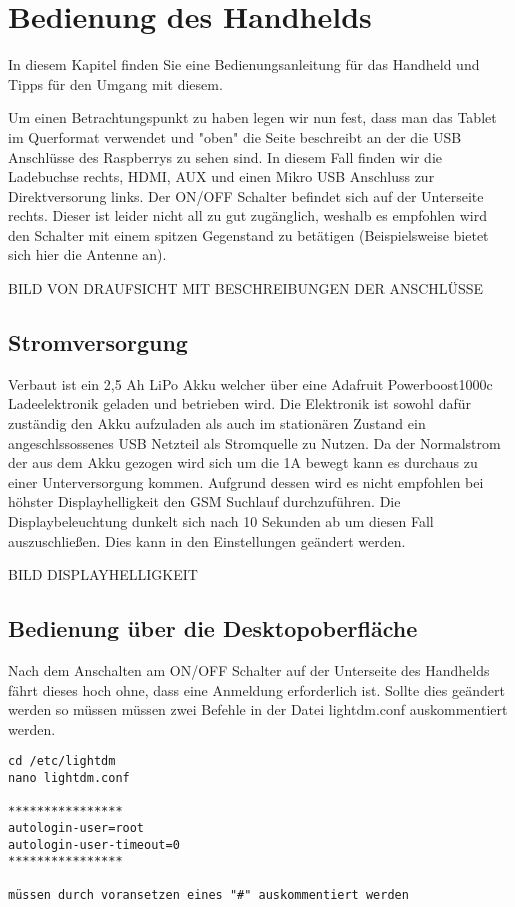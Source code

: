%
%
\chapter{Bedienung des Handhelds}
In diesem Kapitel finden Sie eine Bedienungsanleitung für das Handheld und Tipps für den Umgang mit diesem.

Um einen Betrachtungspunkt zu haben legen wir nun fest, dass man das Tablet im Querformat verwendet und "oben" die Seite beschreibt an der die USB Anschlüsse des Raspberrys zu sehen sind. In diesem Fall finden wir die Ladebuchse rechts, HDMI, AUX und einen Mikro USB Anschluss zur Direktversorung links. Der ON/OFF Schalter befindet sich auf der Unterseite rechts. Dieser ist leider nicht all zu gut zugänglich, weshalb es empfohlen wird den Schalter mit einem spitzen Gegenstand zu betätigen (Beispielsweise bietet sich hier die Antenne an).

BILD VON DRAUFSICHT MIT BESCHREIBUNGEN DER ANSCHLÜSSE 

\section{Stromversorgung}

Verbaut ist ein 2,5 Ah LiPo Akku welcher über eine Adafruit Powerboost1000c Ladeelektronik geladen und betrieben wird. Die Elektronik ist sowohl dafür zuständig den Akku aufzuladen als auch im stationären Zustand ein angeschlssossenes USB Netzteil als Stromquelle zu Nutzen. Da der Normalstrom der aus dem Akku gezogen wird sich um die 1A bewegt kann es durchaus zu einer Unterversorgung kommen. Aufgrund dessen wird es nicht empfohlen bei höhster Displayhelligkeit den GSM Suchlauf durchzuführen. Die Displaybeleuchtung dunkelt sich nach 10 Sekunden ab um diesen Fall auszuschließen. Dies kann in den Einstellungen geändert werden. 

BILD DISPLAYHELLIGKEIT

\section{Bedienung über die Desktopoberfläche}

Nach dem Anschalten am ON/OFF Schalter auf der Unterseite des Handhelds fährt dieses hoch ohne, dass eine Anmeldung erforderlich ist. Sollte dies geändert werden so müssen müssen zwei Befehle in der Datei lightdm.conf auskommentiert werden. 
\begin{verbatim}
cd /etc/lightdm
nano lightdm.conf

****************
autologin-user=root
autologin-user-timeout=0
****************

müssen durch voransetzen eines "#" auskommentiert werden
\end{verbatim}


